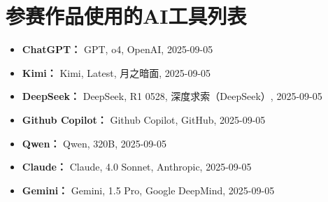 \section{参赛作品使用的AI工具列表}

\begin{itemize}
    \item \textbf{ChatGPT：} GPT, o4, OpenAI, 2025-09-05
    \item \textbf{Kimi：} Kimi, Latest, 月之暗面, 2025-09-05
    \item \textbf{DeepSeek：}  DeepSeek, R1 0528, 深度求索（DeepSeek）, 2025-09-05
    \item \textbf{Github Copilot：} Github Copilot, GitHub, 2025-09-05
    \item \textbf{Qwen：} Qwen, 320B, 2025-09-05
    \item \textbf{Claude：} Claude, 4.0 Sonnet, Anthropic, 2025-09-05
    \item \textbf{Gemini：} Gemini, 1.5 Pro, Google DeepMind, 2025-09-05
\end{itemize}

\newenvironment{GPTblock}
{
    \begin{tcolorbox}[colback=blue!5, colframe=blue!50, title={
        \raisebox{-.2em}{\texttt{[image: icons/openai.png]}}\hspace{0.5em}\textcolor{black}{ChatGPT}
    }]
}
{
    \vspace{0.5em}
    \begin{flushright}
        \scriptsize
        \textbf{模型使用信息：} ChatGPT，GPT，o4，OpenAI，2025-09-05
    \end{flushright}
    \end{tcolorbox}
}

\newenvironment{KimiBlock}
{
    \begin{tcolorbox}[colback=purple!5, colframe=purple!50, title={
        \raisebox{-.2em}{\texttt{[image: icons/kimi-color.png]}}\hspace{0.5em}\textcolor{black}{Kimi}
    }]
}
{
    \vspace{0.5em}
    \begin{flushright}
        \scriptsize
        \textbf{模型使用信息：} Kimi，Latest，月之暗面，2025-09-05
    \end{flushright}
    \end{tcolorbox}
}

